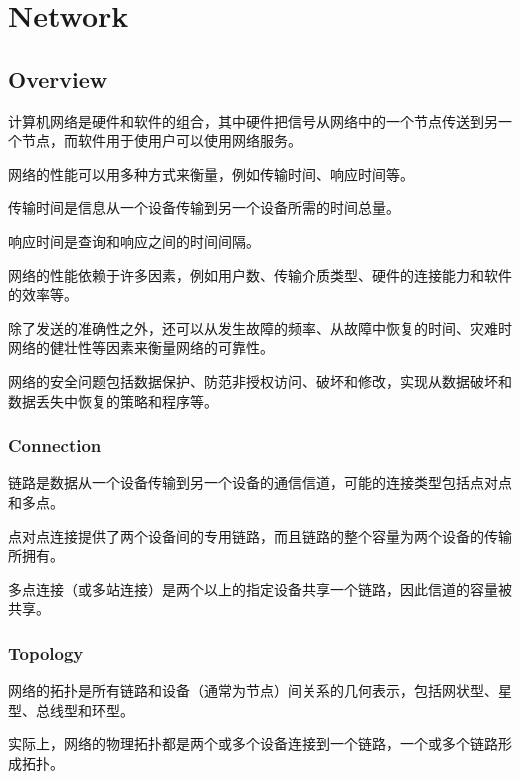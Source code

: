 \part{Network}

\chapter{Overview}


计算机网络是硬件和软件的组合，其中硬件把信号从网络中的一个节点传送到另一个节点，而软件用于使用户可以使用网络服务。

网络的性能可以用多种方式来衡量，例如传输时间、响应时间等。

\begin{compactitem}
\item 传输时间是信息从一个设备传输到另一个设备所需的时间总量。
\item 响应时间是查询和响应之间的时间间隔。
\end{compactitem}

网络的性能依赖于许多因素，例如用户数、传输介质类型、硬件的连接能力和软件的效率等。

除了发送的准确性之外，还可以从发生故障的频率、从故障中恢复的时间、灾难时网络的健壮性等因素来衡量网络的可靠性。

网络的安全问题包括数据保护、防范非授权访问、破坏和修改，实现从数据破坏和数据丢失中恢复的策略和程序等。

\section{Connection}

链路是数据从一个设备传输到另一个设备的通信信道，可能的连接类型包括点对点和多点。

\begin{compactitem}
\item 点对点连接提供了两个设备间的专用链路，而且链路的整个容量为两个设备的传输所拥有。
\item 多点连接（或多站连接）是两个以上的指定设备共享一个链路，因此信道的容量被共享。
\end{compactitem}

\section{Topology}

网络的拓扑是所有链路和设备（通常为节点）间关系的几何表示，包括网状型、星型、总线型和环型。

实际上，网络的物理拓扑都是两个或多个设备连接到一个链路，一个或多个链路形成拓扑。

